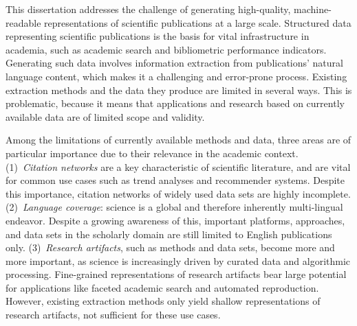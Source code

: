 \Abstract{}
This dissertation addresses the challenge of generating high-quality, machine-readable representations of scientific publications at a large scale.
Structured data representing scientific publications is the basis for vital infrastructure in academia, such as academic search and bibliometric performance indicators. %
Generating such data involves information extraction from publications' natural language content, which makes it a challenging and error-prone process.
Existing extraction methods and the data they produce are limited in several ways. %
This is problematic, because it means that applications and research based on currently available data are of limited scope and validity.

Among the limitations of currently available methods %
and data,
three areas are of particular importance due to their relevance in the academic context.
(1)~\emph{Citation networks} are a key characteristic of scientific literature, and are vital for common use cases such as trend analyses and recommender systems. Despite this importance,
citation networks of widely used data sets are highly incomplete.
(2)~\emph{Language coverage}: science is a global and therefore inherently multi-lingual endeavor.
Despite a growing awareness of this, %
important platforms, approaches, and data sets in the scholarly domain are still limited to English publications only.
(3)~\emph{Research artifacts}, such as methods and data sets, become more and more important, as science is increasingly driven by curated data and algorithmic processing. Fine-grained representations of research artifacts bear large potential for applications like faceted academic search and automated reproduction. However, existing extraction methods only yield shallow representations of research artifacts, not sufficient for these use cases.

